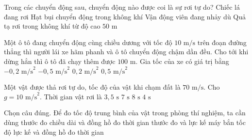 \begin{ex}
	Trong các chuyển động sau, chuyển động nào được coi là sự rơi tự do?
	\choice
	{Chiếc lá đang rơi}
	{Hạt bụi chuyển động trong không khí}
	{Vận động viên đang nhảy dù}
	{\True Quả tạ rơi trong không khí từ độ cao $50\text{ m}$}
\end{ex}

\begin{ex}
	Một ô tô đang chuyển động cùng chiều dương với tốc độ $10\text{ m/s}$ trên đoạn đường thẳng thì người lái xe hãm phanh và ô tô chuyển động chậm dần đều. Cho tới khi dừng hẳn thì ô tô đã chạy thêm được $100\text{ m}$. Gia tốc của xe có giá trị bằng
	\choice
	{$-0{,}2\text{ m/s}^2$}
	{\True $-0{,}5\text{ m/s}^2$}
	{$0{,}2\text{ m/s}^2$}
	{$0{,}5\text{ m/s}^2$}
\end{ex}

\begin{ex}
	Một vật được thả rơi tự do, tốc độ của vật khi chạm đất là $70\text{ m/s}$. Cho $g = 10\text{ m/s}^2$. Thời gian vật rơi là
	\choice
	{$3{,}5\text{ s}$}
	{\True $7\text{ s}$}
	{$8\text{ s}$}
	{$4\text{ s}$}
\end{ex}

\begin{ex}
	Chọn câu đúng. Để đo tốc độ trung bình của vật trong phòng thí nghiệm, ta cần dùng
	\choice
	{\True thước đo chiều dài và đồng hồ đo thời gian}
	{thước đo và lực kế}
	{máy bắn tốc độ}
	{lực kế và đồng hồ đo thời gian}
\end{ex}

